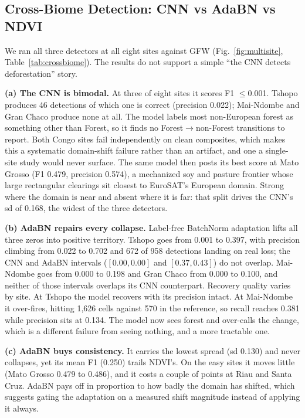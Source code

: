 \documentclass[journal]{IEEEtran}
\begin{document}
\subsection{Cross-Biome Detection: CNN vs AdaBN vs NDVI}
\label{sec:crossbiome}
We ran all three detectors at all eight sites against GFW
(Fig.~\ref{fig:multisite}, Table~\ref{tab:crossbiome}). The results do not support
a simple ``the CNN detects deforestation'' story.

\textbf{(a) The CNN is bimodal.} At three of eight sites it scores F1 $\leq$0.001.
Tshopo produces 46 detections of which one is correct (precision 0.022);
Mai-Ndombe and Gran Chaco produce none at all. The model labels most non-European
forest as something other than Forest, so it finds no Forest$\rightarrow$non-Forest
transitions to report. Both Congo sites fail independently on clean composites,
which makes this a systematic domain-shift failure rather than an artifact, and one
a single-site study would never surface. The same model then posts its best score
at Mato Grosso (F1 0.479, precision 0.574), a mechanized soy and pasture frontier
whose large rectangular clearings sit closest to EuroSAT's European domain. Strong
where the domain is near and absent where it is far: that split drives the CNN's sd
of 0.168, the widest of the three detectors.

\textbf{(b) AdaBN repairs every collapse.} Label-free BatchNorm adaptation lifts
all three zeros into positive territory. Tshopo goes from 0.001 to 0.397, with
precision climbing from 0.022 to 0.702 and 672 of 958 detections landing on real
loss; the CNN and AdaBN intervals ($[0.00,0.00]$ and $[0.37,0.43]$) do not overlap.
Mai-Ndombe goes from 0.000 to 0.198 and Gran Chaco from 0.000 to 0.100, and neither
of those intervals overlaps its CNN counterpart. Recovery quality varies by site. At
Tshopo the model recovers with its precision intact. At Mai-Ndombe it over-fires,
hitting 1{,}626 cells against 570 in the reference, so recall reaches 0.381 while
precision sits at 0.134. The model now sees forest and over-calls the change, which
is a different failure from seeing nothing, and a more tractable one.

\textbf{(c) AdaBN buys consistency.} It carries the lowest spread (sd
0.130) and never collapses, yet its mean F1 (0.250) trails NDVI's. On the easy
sites it moves little (Mato Grosso 0.479 to 0.486), and it costs a couple of points
at Riau and Santa Cruz. AdaBN pays off in proportion to how badly the domain has
shifted, which suggests gating the adaptation on a measured shift magnitude instead
of applying it always.
\end{document}
